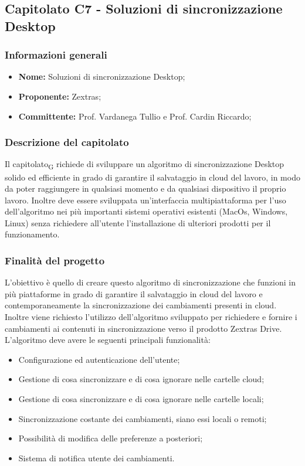 \subsection{Capitolato C7 - Soluzioni di sincronizzazione Desktop}
\subsubsection{Informazioni generali}
	\begin{itemize}
	\item \textbf{Nome:} Soluzioni di sincronizzazione Desktop;
	\item \textbf{Proponente:} Zextras;
	\item \textbf{Committente:}  Prof. Vardanega Tullio e Prof. Cardin Riccardo;
	\end{itemize}
\subsubsection{Descrizione del capitolato}
Il capitolato\textsubscript{G} richiede di sviluppare un algoritmo di sincronizzazione Desktop solido ed efficiente in grado di garantire il salvataggio in cloud del lavoro, in modo da poter raggiungere in qualsiasi momento e da qualsiasi dispositivo il proprio lavoro. Inoltre deve essere sviluppata un'interfaccia multipiattaforma per l'uso dell'algoritmo nei più importanti sistemi operativi esistenti (MacOs, Windows, Linux) senza richiedere all'utente l'installazione di ulteriori prodotti per il funzionamento.
\subsubsection{Finalità del progetto}
L'obiettivo è quello di creare questo algoritmo di sincronizzazione che funzioni in più piattaforme in grado di garantire il salvataggio in cloud del lavoro e contemporaneamente la sincronizzazione dei cambiamenti presenti in cloud. Inoltre viene richiesto l'utilizzo dell’algoritmo sviluppato per richiedere e fornire i cambiamenti ai contenuti in sincronizzazione verso il prodotto Zextras Drive.
L'algoritmo deve avere le seguenti principali funzionalità:
\begin{itemize}
\item {Configurazione ed autenticazione dell’utente};
\item {Gestione di cosa sincronizzare e di cosa ignorare nelle cartelle cloud};
\item {Gestione di cosa sincronizzare e di cosa ignorare nelle cartelle locali};
\item {Sincronizzazione costante dei cambiamenti, siano essi locali o remoti};
\item {Possibilità di modifica delle preferenze a posteriori};
\item {Sistema di notifica utente dei cambiamenti}.
\end{itemize}
